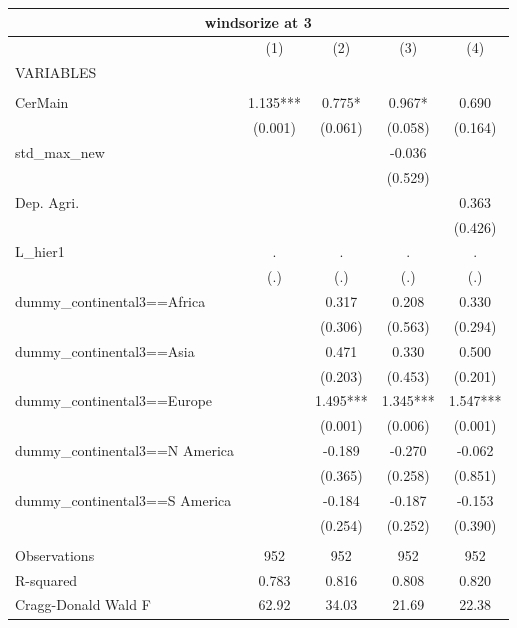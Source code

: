 \begin{tabular}{lcccc}
\multicolumn{5}{c}{windsorize at 3} \\ \hline
 & (1) & (2) & (3) & (4) \\
VARIABLES &  &  &  &  \\ \hline
 &  &  &  &  \\
CerMain & 1.135*** & 0.775* & 0.967* & 0.690 \\
 & (0.001) & (0.061) & (0.058) & (0.164) \\
std\_max\_new &  &  & -0.036 &  \\
 &  &  & (0.529) &  \\
Dep. Agri. &  &  &  & 0.363 \\
 &  &  &  & (0.426) \\
L\_hier1 & . & . & . & . \\
 & (.) & (.) & (.) & (.) \\
dummy\_continental3==Africa &  & 0.317 & 0.208 & 0.330 \\
 &  & (0.306) & (0.563) & (0.294) \\
dummy\_continental3==Asia &  & 0.471 & 0.330 & 0.500 \\
 &  & (0.203) & (0.453) & (0.201) \\
dummy\_continental3==Europe &  & 1.495*** & 1.345*** & 1.547*** \\
 &  & (0.001) & (0.006) & (0.001) \\
dummy\_continental3==N America &  & -0.189 & -0.270 & -0.062 \\
 &  & (0.365) & (0.258) & (0.851) \\
dummy\_continental3==S America &  & -0.184 & -0.187 & -0.153 \\
 &  & (0.254) & (0.252) & (0.390) \\
 &  &  &  &  \\
Observations & 952 & 952 & 952 & 952 \\
R-squared & 0.783 & 0.816 & 0.808 & 0.820 \\
 Cragg-Donald Wald F & 62.92 & 34.03 & 21.69 & 22.38 \\ \hline
\end{tabular}
